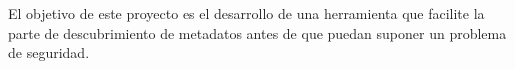 El objetivo de este proyecto es el desarrollo de una herramienta que facilite la parte de descubrimiento de metadatos antes de que puedan suponer un problema de seguridad.